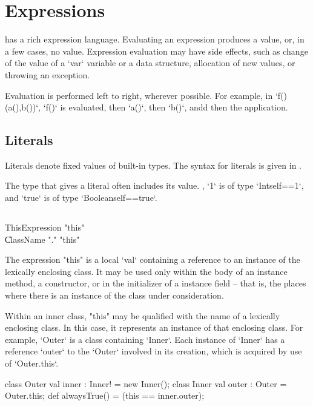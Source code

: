 \chapter{Expressions}\label{XtenExpressions}

\Xten{} has a rich expression language.
Evaluating an expression produces a value, or, in a few cases, no value. 
Expression evaluation may have side effects, such as change of the value of a 
\xcd`var` variable or a data structure, allocation of new values, or throwing
an exception. 

Evaluation is performed left to right, wherever possible.  For example, in 
\xcd`f()(a(),b())`, \xcd`f()` is evaluated, then \xcd`a()`, then \xcd`b()`,
andd then the application.  

\section{Literals}

Literals denote fixed values of built-in types. 
The syntax for literals is given in . 

The type that \Xten{} gives a literal often includes its value. \Eg, \xcd`1`
is of type \xcd`Int{self==1}`, and \xcd`true` is of type
\xcd`Boolean{self==true}`.

\section{}

\begin{grammar}
ThisExpression \: \xcd"this" \\
\| ClassName \xcd"." \xcd"this" \\
\end{grammar}

The expression \xcd"this" is a  local \xcd`val` containing a reference
to an instance of the lexically enclosing class.
It may be used only within the body of an instance method, a
constructor, or in the initializer of a instance field -- that is, the places
where there is an instance of the class under consideration.

Within an inner class, \xcd"this" may be qualified with the
name of a lexically enclosing class.  In this case, it
represents an instance of that enclosing class.  
For example, \xcd`Outer` is a class containing \xcd`Inner`.  Each instance of
\xcd`Inner` has a reference \xcd`outer` to the \xcd`Outer` involved in its
creation, which is acquired by use of \xcd`Outer.this`.
\begin{xten}
class Outer {
  val inner : Inner! = new Inner();
  class Inner {
    val outer : Outer = Outer.this;
  }
  def alwaysTrue() = (this == inner.outer);
}
\end{xten}
%

